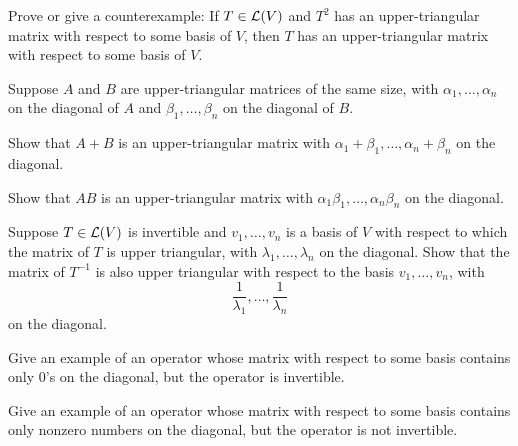 \begin{exc}

\begin{exercise}
Prove or give a counterexample: If $T\in\mathcal{L}(V)$ and $T^2$ has an
upper-triangular matrix with respect to some basis of $V$, then $T$ has an
upper-triangular matrix with respect to some basis of $V$.
\end{exercise}

\begin{exercise}
Suppose $A$ and $B$ are upper-triangular matrices of the same size, with
$\alpha_1,\dots,\alpha_n$ on the diagonal of $A$ and $\beta_1,\dots,\beta_n$ on
the diagonal of $B$.
\begin{parts}
\item Show that $A+B$ is an upper-triangular matrix with
  $\alpha_1+\beta_1,\dots,\alpha_n+\beta_n$ on the diagonal.
\item Show that $AB$ is an upper-triangular matrix with
  $\alpha_1\beta_1,\dots,\alpha_n\beta_n$ on the diagonal.
\end{parts}
\end{exercise}

\begin{exercise}
Suppose $T\in\mathcal{L}(V)$ is invertible and $v_1,\dots,v_n$ is a basis of $V$ with
respect to which the matrix of $T$ is upper triangular, with
$\lambda_1,\dots,\lambda_n$ on the diagonal. Show that the matrix of $T^{-1}$ is
also upper triangular with respect to the basis $v_1,\dots,v_n$, with
\[ \frac{1}{\lambda_1},\dots,\frac{1}{\lambda_n} \]
on the diagonal.
\end{exercise}

\begin{exercise}
Give an example of an operator whose matrix with respect to some basis contains
only $0$'s on the diagonal, but the operator is invertible.
\end{exercise}

\begin{exercise}
Give an example of an operator whose matrix with respect to some basis contains
only nonzero numbers on the diagonal, but the operator is not invertible.
\end{exercise}


\end{exc}
